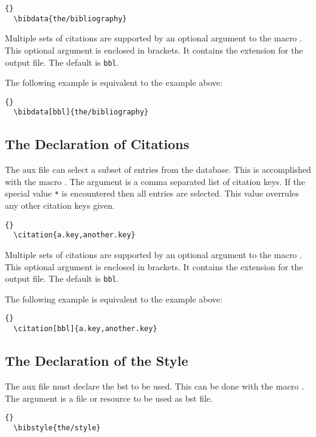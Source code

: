 \begin{lstlisting}{}
  \bibdata{the/bibliography}
\end{lstlisting}

Multiple sets of citations are supported by an optional argument to
the macro . This optional argument is enclosed in
brackets. It contains the extension for the output file. The default
is \texttt{bbl}.

The following example is equivalent to the example above:

\begin{lstlisting}{}
  \bibdata[bbl]{the/bibliography}
\end{lstlisting}


\subsection{The Declaration of Citations}

The aux file can select a subset of entries from the database. This is
accomplished with the macro . The argument is a comma
separated list of citation keys. If the special value \verb|*| is
encountered then all entries are selected. This value overrules any
other citation keys given.

\begin{lstlisting}{}
  \citation{a.key,another.key}
\end{lstlisting}

Multiple sets of citations are supported by an optional argument to
the macro . This optional argument is enclosed in
brackets. It contains the extension for the output file. The default
is \texttt{bbl}.

The following example is equivalent to the example above:

\begin{lstlisting}{}
  \citation[bbl]{a.key,another.key}
\end{lstlisting}


\subsection{The Declaration of the Style}

The aux file must declare the bst to be used. This can be done with
the macro . The argument is a file or resource to be
used as bst file.

\begin{lstlisting}{}
  \bibstyle{the/style}
\end{lstlisting}

